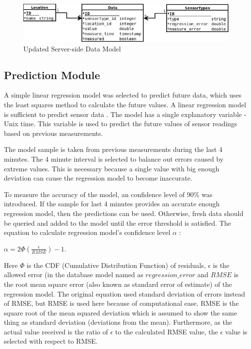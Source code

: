 \begin{figure}[h!]
\centering
\includegraphics[scale=0.6]{4/figures/data_model_final.jpg}
\caption{Updated Server-side Data Model}
\label{data_model_final}
\end{figure}

\subsection{Prediction Module}

A simple linear regression model was selected to predict future data, which uses the least squares method to calculate the future values. A linear regression model is sufficient to predict sensor data \cite[p. 1066]{cluster_wsn_paper}. The model has a single explanatory variable - Unix time. This variable is used to predict the future values of sensor readings based on previous measurements. 

The model sample is taken from previous measurements during the last 4 minutes. The 4 minute interval is selected to balance out errors caused by extreme values. This is necessary because a single value with big enough deviation can cause the regression model to become inaccurate. 

To measure the accuracy of the model, an confidence level of 90\% was introduced. If the sample for last 4 minutes provides an accurate enough regression model, then the predictions can be used. Otherwise, fresh data should be queried and added to the model until the error threshold is satisfied. The equation to calculate regression model's confidence level $\alpha$ \cite[p. 1066]{cluster_wsn_paper}:\\

\begin{center}
$\alpha = 2\Phi \left ( \frac{\epsilon}{RMSE}  \right ) - 1$.
\end{center}

Here $\Phi$ is the CDF (Cumulative Distribution Function) of residuals, $\epsilon$ is the allowed error (in the database model named as $regression\_error$ and $RMSE$ is the root mean square error (also known as standard error of estimate) of the regression model. The original equation used standard deviation of errors instead of RMSE, but RMSE is used here because of computational ease. RMSE is the square root of the mean squared deviation \cite{RMSE} which is assumed to show the same thing as standard deviation (deviations from the mean). Furthermore, as the actual value received is the ratio of $\epsilon$ to the calculated RMSE value, the $\epsilon$ value is selected with respect to RMSE.

